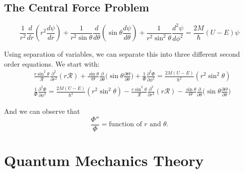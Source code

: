 \documentclass[11pt,fleqn]{book}
\begin{document}
\section{The Central Force Problem}
\begin{theorem}
    $$\frac{1}{r^2}\frac{d}{dr}\left(r^2\frac{d\psi}{dr}\right) + \frac{1}{r^2\sin\theta}\frac{d}{d\theta}\left(\sin\theta\frac{d\psi}{d\theta}\right) + \frac{1}{r^2\sin^2\theta}\frac{d^2\psi}{d\phi^2}=\frac{2M}{\hslash}(U-E)\psi$$
\end{theorem}
Using separation of variables, we can separate this into three different second order equations. We start with:
\begin{align*}
&\frac{r\sin^2\theta}{\mathcal{R}}\frac{\partial^2}{\partial r^2}(r\mathcal{R}) + \frac{\sin\theta}{\Theta}\frac{\partial}{\partial\theta}\bigg(\sin\theta\frac{\partial\Theta}{\partial\theta}\bigg)+\frac{1}{\Phi}\frac{\partial^2\Phi}{\partial\phi^2} = \frac{2M(U-E)}{\hslash^2}(r^2\sin^2\theta)\\
&\frac{1}{\Phi}\frac{\partial^2\Phi}{\partial\phi^2} = \frac{2M(U-E)}{\hslash^2}(r^2\sin^2\theta)-\frac{r\sin^2\theta}{\mathcal{R}}\frac{\partial^2}{\partial r^2}(r\mathcal{R})-\frac{\sin\theta}{\Theta}\frac{\partial}{\partial\theta}\bigg(\sin\theta\frac{\partial\Theta}{\partial\theta}\bigg)
\end{align*}

And we can observe that 
$$\frac{\Phi''}{\Phi} = \text{function of $r$ and $\theta$}.$$

\chapter{Quantum Mechanics Theory}















\end{document}
